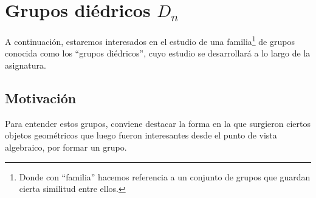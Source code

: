 \section{Grupos diédricos $D_n$}
A continuación, estaremos interesados en el estudio de una familia\footnote{Donde con ``familia'' hacemos referencia a un conjunto de grupos que guardan cierta similitud entre ellos.} de grupos conocida como los ``grupos diédricos'', cuyo estudio se desarrollará a lo largo de la asignatura.

\subsection{Motivación}
Para entender estos grupos, conviene destacar la forma en la que surgieron ciertos objetos geométricos que luego fueron interesantes desde el punto de vista algebraico, por formar un grupo.\\

